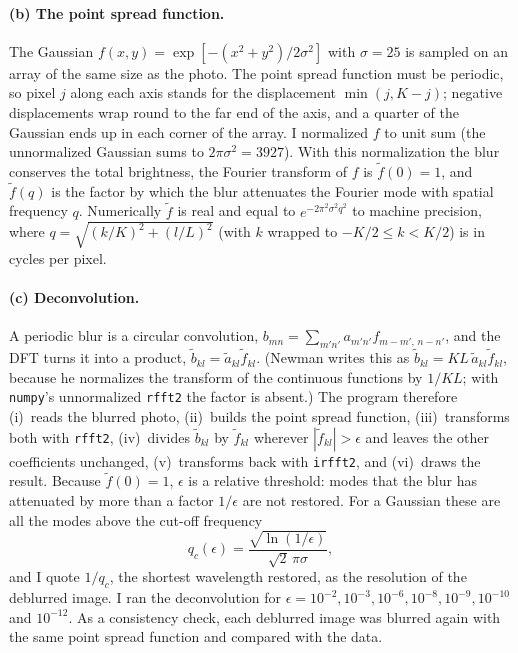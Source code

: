 \documentclass[11pt]{article}
\newcommand{\eps}{\epsilon}
\newcommand{\code}[1]{\texttt{#1}}
\begin{document}
\paragraph{(b) The point spread function.}
The Gaussian $f(x,y)=\exp[-(x^2+y^2)/2\sigma^2]$ with $\sigma=25$ is sampled on
an array of the same size as the photo. The point spread function must be
periodic, so pixel $j$ along each axis stands for the displacement
$\min(j, K-j)$; negative displacements wrap round to the far end of the axis,
and a quarter of the Gaussian ends up in each corner of the array. I normalized
$f$ to unit sum (the unnormalized Gaussian sums to $2\pi\sigma^2 = 3927$).
With this normalization the blur conserves the total brightness, the Fourier
transform of $f$ is $\tilde f(0)=1$, and $\tilde f(q)$ is the factor by which
the blur attenuates the Fourier mode with spatial frequency $q$. Numerically
$\tilde f$ is real and equal to $e^{-2\pi^2\sigma^2q^2}$ to machine precision,
where $q = \sqrt{(k/K)^2+(l/L)^2}$ (with $k$ wrapped to $-K/2\le k<K/2$) is in
cycles per pixel.

\paragraph{(c) Deconvolution.}
A periodic blur is a circular convolution,
$b_{mn} = \sum_{m'n'} a_{m'n'} f_{m-m',\,n-n'}$, and the DFT turns it into a
product, $\tilde b_{kl} = \tilde a_{kl}\tilde f_{kl}$. (Newman writes this as
$\tilde b_{kl} = KL\,\tilde a_{kl}\tilde f_{kl}$, because he normalizes the
transform of the continuous functions by $1/KL$; with \code{numpy}'s unnormalized
\code{rfft2} the factor is absent.) The program therefore
(i)~reads the blurred photo, (ii)~builds the point spread function,
(iii)~transforms both with \code{rfft2}, (iv)~divides $\tilde b_{kl}$ by
$\tilde f_{kl}$ wherever $|\tilde f_{kl}| > \eps$ and leaves the other
coefficients unchanged, (v)~transforms back with \code{irfft2}, and (vi)~draws
the result. Because $\tilde f(0)=1$, $\eps$ is a relative threshold: modes that
the blur has attenuated by more than a factor $1/\eps$ are not restored. For a
Gaussian these are all the modes above the cut-off frequency
\[
q_c(\eps) = \frac{\sqrt{\ln(1/\eps)}}{\sqrt2\,\pi\sigma},
\]
and I quote $1/q_c$, the shortest wavelength restored, as the resolution of the
deblurred image. I ran the deconvolution for
$\eps = 10^{-2}, 10^{-3}, 10^{-6}, 10^{-8}, 10^{-9}, 10^{-10}$ and $10^{-12}$.
As a consistency check, each deblurred image was blurred again with the same
point spread function and compared with the data.
\end{document}
